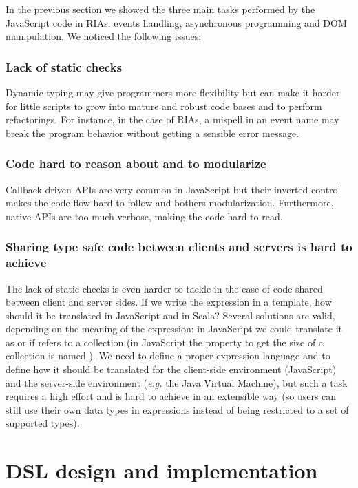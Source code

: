 \documentclass[american,english,runningheads]{llncs}
\newcommand{\eg}{\emph{e.g.}}
\begin{document}
In the previous section we showed the three main tasks performed by the JavaScript code in RIAs: events handling,
asynchronous programming and DOM manipulation. We noticed the following issues:

\subsubsection{Lack of static checks}

Dynamic typing may give programmers more flexibility but can make it harder for little scripts to grow into mature
and robust code bases and to perform refactorings. For instance, in the case of RIAs, a mispell in an event name may
break the program behavior without getting a sensible error message.

\subsubsection{Code hard to reason about and to modularize}

Callback-driven APIs are very common in JavaScript but their inverted control makes the code flow hard to follow and
bothers modularization. Furthermore, native APIs are too much verbose, making the code hard to read.

\subsubsection{Sharing type safe code between clients and servers is hard to achieve}

The lack of static checks is even harder to tackle in the case of code shared between client and server sides. If we
write the expression  in a template, how should it be translated in JavaScript and in Scala?
Several solutions are valid, depending on the meaning of the expression: in JavaScript we could translate it as
 or  if  refers to a collection (in JavaScript the property to get
the size of a collection is named ). We need to define a proper expression language and to define how it
should be translated for the client-side environment (JavaScript) and the server-side environment (\eg{} the Java
Virtual Machine), but such a task requires a high effort and is hard to achieve in an extensible way (so users can
still use their own data types in expressions instead of being restricted to a set of supported types).

\section{DSL design and implementation}
\label{solution}
\end{document}
